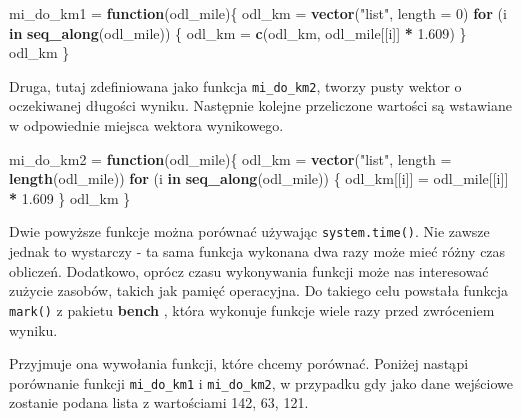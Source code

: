 \documentclass[paper=6in:9in,pagesize=pdftex,headinclude=on,footinclude=on,10pt]{scrbook}
\newenvironment{Shaded}{\begin{snugshade}}{\end{snugshade}}
\newcommand{\ControlFlowTok}[1]{\textcolor[rgb]{0.13,0.29,0.53}{\textbf{#1}}}
\newcommand{\DataTypeTok}[1]{\textcolor[rgb]{0.13,0.29,0.53}{#1}}
\newcommand{\DecValTok}[1]{\textcolor[rgb]{0.00,0.00,0.81}{#1}}
\newcommand{\FloatTok}[1]{\textcolor[rgb]{0.00,0.00,0.81}{#1}}
\newcommand{\KeywordTok}[1]{\textcolor[rgb]{0.13,0.29,0.53}{\textbf{#1}}}
\newcommand{\NormalTok}[1]{#1}
\newcommand{\OperatorTok}[1]{\textcolor[rgb]{0.81,0.36,0.00}{\textbf{#1}}}
\newcommand{\StringTok}[1]{\textcolor[rgb]{0.31,0.60,0.02}{#1}}
\begin{document}
\begin{Shaded}
\begin{Highlighting}[]
\NormalTok{mi_do_km1 =}\StringTok{ }\ControlFlowTok{function}\NormalTok{(odl_mile)\{}
\NormalTok{  odl_km =}\StringTok{ }\KeywordTok{vector}\NormalTok{(}\StringTok{"list"}\NormalTok{, }\DataTypeTok{length =} \DecValTok{0}\NormalTok{)}
  \ControlFlowTok{for}\NormalTok{ (i }\ControlFlowTok{in} \KeywordTok{seq_along}\NormalTok{(odl_mile)) \{}
\NormalTok{    odl_km =}\StringTok{ }\KeywordTok{c}\NormalTok{(odl_km, odl_mile[[i]] }\OperatorTok{*}\StringTok{ }\FloatTok{1.609}\NormalTok{)}
\NormalTok{  \}}
\NormalTok{  odl_km}
\NormalTok{\}}
\end{Highlighting}
\end{Shaded}

Druga, tutaj zdefiniowana jako funkcja \texttt{mi\_do\_km2}, tworzy pusty wektor o oczekiwanej długości wyniku.
Następnie kolejne przeliczone wartości są wstawiane w odpowiednie miejsca wektora wynikowego.

\begin{Shaded}
\begin{Highlighting}[]
\NormalTok{mi_do_km2 =}\StringTok{ }\ControlFlowTok{function}\NormalTok{(odl_mile)\{}
\NormalTok{  odl_km =}\StringTok{ }\KeywordTok{vector}\NormalTok{(}\StringTok{"list"}\NormalTok{, }\DataTypeTok{length =} \KeywordTok{length}\NormalTok{(odl_mile))}
  \ControlFlowTok{for}\NormalTok{ (i }\ControlFlowTok{in} \KeywordTok{seq_along}\NormalTok{(odl_mile)) \{}
\NormalTok{    odl_km[[i]] =}\StringTok{ }\NormalTok{odl_mile[[i]] }\OperatorTok{*}\StringTok{ }\FloatTok{1.609}
\NormalTok{  \}}
\NormalTok{  odl_km}
\NormalTok{\}}
\end{Highlighting}
\end{Shaded}

Dwie powyższe funkcje można porównać używając \texttt{system.time()}.
Nie zawsze jednak to wystarczy - ta sama funkcja wykonana dwa razy może mieć różny czas obliczeń.
Dodatkowo, oprócz czasu wykonywania funkcji może nas interesować zużycie zasobów, takich jak pamięć operacyjna.
Do takiego celu powstała funkcja \texttt{mark()} z pakietu \textbf{bench} \citep{R-bench}, która wykonuje funkcje wiele razy przed zwróceniem wyniku.

Przyjmuje ona wywołania funkcji, które chcemy porównać.
Poniżej nastąpi porównanie funkcji \texttt{mi\_do\_km1} i \texttt{mi\_do\_km2}, w przypadku gdy jako dane wejściowe zostanie podana lista z wartościami 142, 63, 121.
\end{document}
